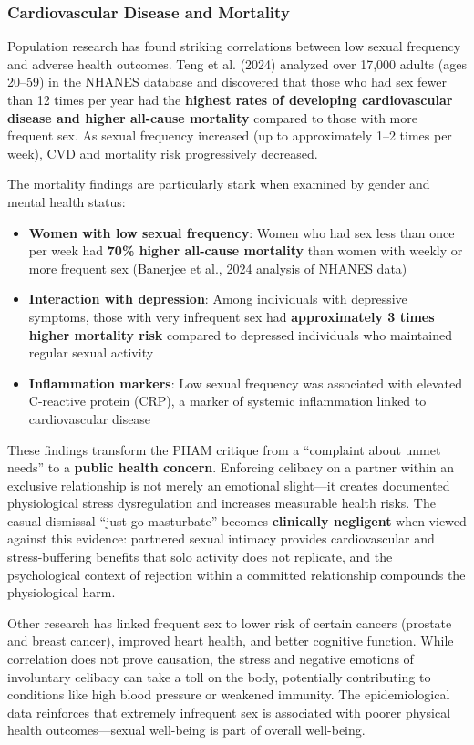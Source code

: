 \documentclass[12pt, letterpaper]{article}
\begin{document}
\subsubsection{Cardiovascular Disease and Mortality}

Population research has found striking correlations between low sexual frequency and adverse health outcomes. Teng et al. (2024) analyzed over 17,000 adults (ages 20--59) in the NHANES database and discovered that those who had sex fewer than 12 times per year had the \textbf{highest rates of developing cardiovascular disease and higher all-cause mortality} compared to those with more frequent sex. As sexual frequency increased (up to approximately 1--2 times per week), CVD and mortality risk progressively decreased.

The mortality findings are particularly stark when examined by gender and mental health status:

\begin{itemize}
    \item \textbf{Women with low sexual frequency}: Women who had sex less than once per week had \textbf{70\% higher all-cause mortality} than women with weekly or more frequent sex (Banerjee et al., 2024 analysis of NHANES data)
    \item \textbf{Interaction with depression}: Among individuals with depressive symptoms, those with very infrequent sex had \textbf{approximately 3 times higher mortality risk} compared to depressed individuals who maintained regular sexual activity
    \item \textbf{Inflammation markers}: Low sexual frequency was associated with elevated C-reactive protein (CRP), a marker of systemic inflammation linked to cardiovascular disease
\end{itemize}

These findings transform the PHAM critique from a ``complaint about unmet needs'' to a \textbf{public health concern}. Enforcing celibacy on a partner within an exclusive relationship is not merely an emotional slight---it creates documented physiological stress dysregulation and increases measurable health risks. The casual dismissal ``just go masturbate'' becomes \textbf{clinically negligent} when viewed against this evidence: partnered sexual intimacy provides cardiovascular and stress-buffering benefits that solo activity does not replicate, and the psychological context of rejection within a committed relationship compounds the physiological harm.

Other research has linked frequent sex to lower risk of certain cancers (prostate and breast cancer), improved heart health, and better cognitive function. While correlation does not prove causation, the stress and negative emotions of involuntary celibacy can take a toll on the body, potentially contributing to conditions like high blood pressure or weakened immunity. The epidemiological data reinforces that extremely infrequent sex is associated with poorer physical health outcomes---sexual well-being is part of overall well-being.
\end{document}
